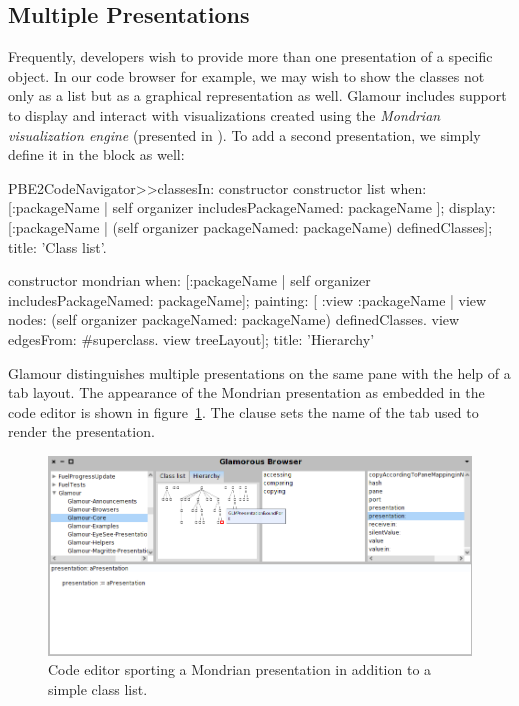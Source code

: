 \documentclass[a4paper,10pt,twoside]{book}
\begin{document}

\subsection{Multiple Presentations}

Frequently, developers wish to provide more than one presentation of a
specific object. In our code browser for example, we may wish to show
the classes not only as a list but as a graphical representation as well. Glamour includes support to display
and interact with visualizations created using the \emph{Mondrian
  visualization engine} (presented in ). To add a second presentation, we simply
define it in the  block as well:

\begin{code}{}
PBE2CodeNavigator>>classesIn: constructor
  constructor list
    when: [:packageName | self organizer includesPackageNamed: packageName ];
    display: [:packageName | (self organizer packageNamed: packageName)
                    definedClasses];
    title: 'Class list'.

  constructor mondrian 
    when: [:packageName | self organizer includesPackageNamed: packageName];
    painting: [ :view :packageName | 
          view nodes: (self organizer packageNamed:  packageName)  
                             definedClasses.
          view edgesFrom:  #superclass.
          view treeLayout];
    title: 'Hierarchy' 
\end{code}

Glamour distinguishes multiple presentations on the same pane with the
help of a tab layout. The appearance of the Mondrian presentation as
embedded in the code editor is shown in
figure~\ref{fig:mondrian-presentation}. The clause  sets
the name of the tab used to render the presentation.

\begin{figure}[htbp]
\centerline{\includegraphics[width=\linewidth]{mondrian-presentation.png}}
\caption{Code editor sporting a Mondrian  presentation in addition to a simple class list.}
\label{fig:mondrian-presentation}
\end{figure}
\end{document}
